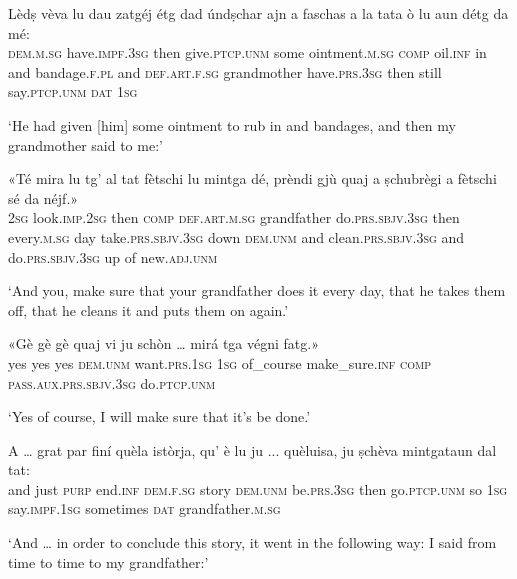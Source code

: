 \begin{linenumbers}
\gll  Lèdṣ vèva lu dau zatgéj étg dad úndṣchar ajn a faschas a la tata ò lu aun détg da mé:  \\
 \textsc{dem.m.sg} have.\textsc{impf.3sg} then  give.\textsc{ptcp.unm} some ointment.\textsc{m.sg} \textsc{comp} oil.\textsc{inf} in and bandage.\textsc{f.pl} and \textsc{def.art.f.sg} grandmother have.\textsc{prs.3sg} then still say.\textsc{ptcp.unm} \textsc{dat} \textsc{1sg}  \\
\end{linenumbers}
\medskip
\glt `He had given [him] some ointment to rub in and bandages, and then my grandmother said to me:'
\medskip

\begin{linenumbers}
\gll  «Té mira lu tg’ al tat fètschi lu mintga dé, prèndi gjù quaj a ṣchubrègi a fètschi sé da néjf.»  \\
 \textsc{2sg} look.\textsc{imp.2sg} then \textsc{comp} \textsc{def.art.m.sg} grandfather do.\textsc{prs.sbjv.3sg} then every.\textsc{m.sg} day take.\textsc{prs.sbjv.3sg} down \textsc{dem.unm} and clean.\textsc{prs.sbjv.3sg} and do.\textsc{prs.sbjv.3sg} up of new.\textsc{adj.unm} \\
\end{linenumbers}
\medskip
\glt `And you, make sure that your grandfather does it every day, that he takes them off, that he cleans it and puts them on again.'
\medskip

\begin{linenumbers}
\gll  «Gè gè gè quaj vi ju schòn … mirá tga végni fatg.»  \\
yes yes yes  \textsc{dem.unm} want.\textsc{prs.1sg} \textsc{1sg} of\_course {}  make\_sure.\textsc{inf} \textsc{comp} \textsc{pass.aux.prs.sbjv.3sg} do.\textsc{ptcp.unm}   \\
\end{linenumbers}
\medskip
\glt `Yes of course, I will make sure that it's be done.'
\medskip

\begin{linenumbers}
\gll  A … grat par finí quèla istòrja, qu’ è lu ju ... quèluisa, ju ṣchèva mintgataun dal tat:  \\
and {} just  \textsc{purp} end.\textsc{inf} \textsc{dem.f.sg} story \textsc{dem.unm} be.\textsc{prs.3sg} then go.\textsc{ptcp.unm} {} so \textsc{1sg} say.\textsc{impf.1sg}  sometimes \textsc{dat} grandfather.\textsc{m.sg} \\
\end{linenumbers}
\medskip
\glt `And … in order to conclude this story, it went in the following way: I said from time to time to my grandfather:'
\medskip


